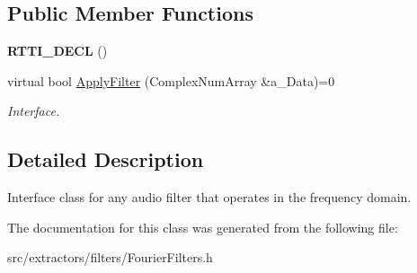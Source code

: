 \subsection*{Public Member Functions}
\begin{DoxyCompactItemize}
\item 
\mbox{\label{class_fourier_filters_1_1_i_fourier_filter_aa134182d4a0906f65c3b7f9187a719a9}} 
{\bfseries R\+T\+T\+I\+\_\+\+D\+E\+CL} ()
\item 
\mbox{\label{class_fourier_filters_1_1_i_fourier_filter_aaebfbd02701cf8f4a07d95863165d863}} 
virtual bool \hyperlink{class_fourier_filters_1_1_i_fourier_filter_aaebfbd02701cf8f4a07d95863165d863}{Apply\+Filter} (Complex\+Num\+Array \&a\+\_\+\+Data)=0
\begin{DoxyCompactList}\small\item\em Interface. \end{DoxyCompactList}\end{DoxyCompactItemize}


\subsection{Detailed Description}
Interface class for any audio filter that operates in the frequency domain. 

The documentation for this class was generated from the following file\+:\begin{DoxyCompactItemize}
\item 
src/extractors/filters/Fourier\+Filters.\+h\end{DoxyCompactItemize}
